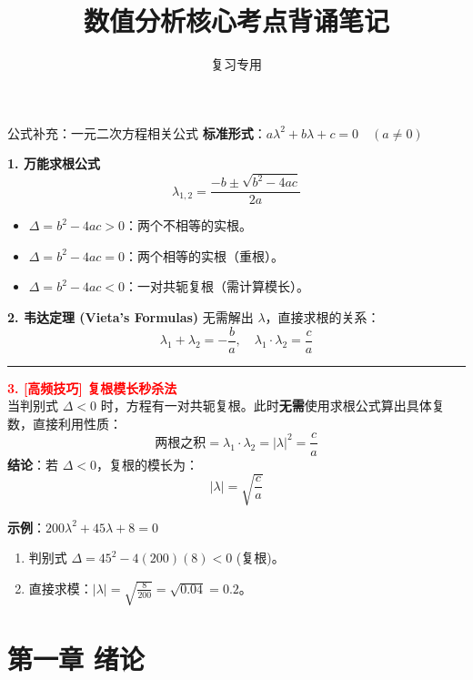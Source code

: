 \documentclass[12pt, a4paper]{article}
\title{\textbf{数值分析核心考点背诵笔记}}
\author{复习专用}
\date{}
\begin{document}
\maketitle
\begin{knowpoint}{公式补充：一元二次方程相关公式}
    \textbf{标准形式}：$a\lambda^2 + b\lambda + c = 0 \quad (a \neq 0)$

    \vspace{0.5em}
    \textbf{1. 万能求根公式}
    \[ \lambda_{1,2} = \frac{-b \pm \sqrt{b^2 - 4ac}}{2a} \]
    \begin{itemize}
        \item $\Delta = b^2 - 4ac > 0$：两个不相等的实根。
        \item $\Delta = b^2 - 4ac = 0$：两个相等的实根（重根）。
        \item $\Delta = b^2 - 4ac < 0$：一对共轭复根（需计算模长）。
    \end{itemize}

    \vspace{0.5em}
    \textbf{2. 韦达定理 (Vieta's Formulas)}
    无需解出 $\lambda$，直接求根的关系：
    \[ \lambda_1 + \lambda_2 = -\frac{b}{a}, \quad \lambda_1 \cdot \lambda_2 = \frac{c}{a} \]

    \vspace{0.5em}
    \hrule
    \vspace{0.5em}
    
    \textbf{\textcolor{red}{3. [高频技巧] 复根模长秒杀法}}
    \vspace{0.2em}
    \\
    当判别式 $\Delta < 0$ 时，方程有一对共轭复根。此时\textbf{无需}使用求根公式算出具体复数，直接利用性质：
    \[ \text{两根之积} = \lambda_1 \cdot \lambda_2 = |\lambda|^2 = \frac{c}{a} \]
    \textbf{结论}：若 $\Delta < 0$，复根的模长为：
    \[ |\lambda| = \sqrt{\frac{c}{a}} \]
    
    \vspace{0.3em}
    \textbf{示例}：$200\lambda^2 + 45\lambda + 8 = 0$
    \begin{enumerate}
        \item 判别式 $\Delta = 45^2 - 4(200)(8) < 0$ (复根)。
        \item 直接求模：$|\lambda| = \sqrt{\frac{8}{200}} = \sqrt{0.04} = 0.2$。
    \end{enumerate}
\end{knowpoint}
\newpage

\section*{第一章 绪论}
\end{document}
